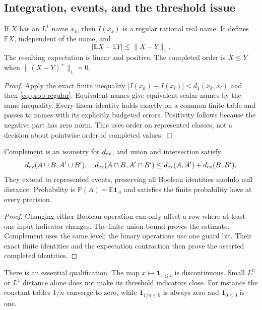 \subsection{Integration, events, and the threshold issue}

\begin{theorem}
If $X$ has an $L^1$ name $x_k$, then $I(x_k)$ is a regular rational real
name. It defines $\mathbb E X$, independent of the name, and
\[
 |\mathbb E X-\mathbb E Y|\le\|X-Y\|_1.
\]
The resulting expectation is linear and positive. The completed order is
$X\le Y$ when $\|(X-Y)^+\|_1=0$.
\end{theorem}
\begin{proof}
Apply the exact finite inequality
$|I(x_k)-I(x_l)|\le d_1(x_k,x_l)$ and then
\eqref{eq:prob-regular}. Equivalent names give equivalent scalar names by
the same inequality. Every linear identity holds exactly on a common finite
table and passes to names with its explicitly budgeted errors. Positivity
follows because the negative part has zero norm. This uses order on represented
classes, not a decision about pointwise order of completed values.
\end{proof}

\begin{proposition}
Complement is an isometry for $d_{\rm ev}$, and union and intersection satisfy
\[
 d_{\rm ev}(A\cup B,A'\cup B'),\quad
 d_{\rm ev}(A\cap B,A'\cap B')
 \le d_{\rm ev}(A,A')+d_{\rm ev}(B,B').
\]
They extend to represented events, preserving all Boolean identities modulo
null distance. Probability is $\mathbb P(A)=\mathbb E\mathbf1_A$ and satisfies
the finite probability laws at every precision.
\end{proposition}
\begin{proof}
Changing either Boolean operation can only affect a row where at least one
input indicator changes. The finite union bound proves the estimate.
Complement uses the same level; the binary operations use one guard bit.
Their exact finite identities and the expectation contraction then prove the
asserted completed identities.
\end{proof}

There is an essential qualification. The map $x\mapsto\mathbf1_{x\le t}$
is discontinuous. Small $L^0$ or $L^1$ distance alone does not make its
threshold indicators close. For instance the constant tables $1/n$ converge
to zero, while $\mathbf1_{1/n\le0}$ is always zero and
$\mathbf1_{0\le0}$ is one.

